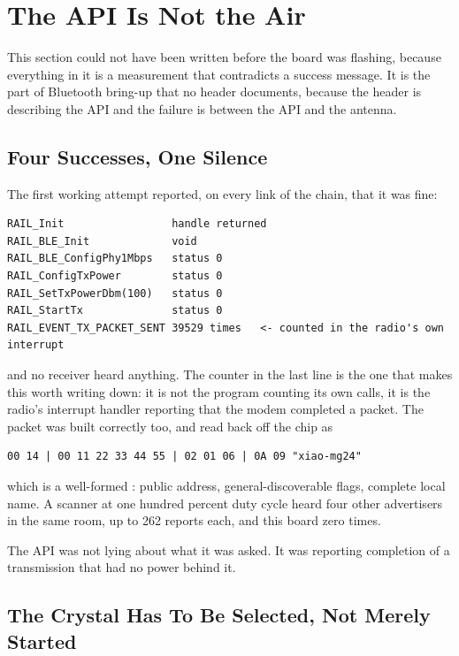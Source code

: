 \section{The API Is Not the Air}
\label{sec:ble-api-not-air}

This section could not have been written before the board was flashing, because everything in it is a
measurement that contradicts a success message. It is the part of Bluetooth bring-up that no header
documents, because the header is describing the API and the failure is between the API and the antenna.

\subsection{Four Successes, One Silence}

The first working attempt reported, on every link of the chain, that it was fine:

\begin{verbatim}
RAIL_Init                 handle returned
RAIL_BLE_Init             void
RAIL_BLE_ConfigPhy1Mbps   status 0
RAIL_ConfigTxPower        status 0
RAIL_SetTxPowerDbm(100)   status 0
RAIL_StartTx              status 0
RAIL_EVENT_TX_PACKET_SENT 39529 times   <- counted in the radio's own interrupt
\end{verbatim}

and no receiver heard anything. The counter in the last line is the one that makes this worth writing
down: it is not the program counting its own calls, it is the radio's interrupt handler reporting that
the modem completed a packet. The packet was built correctly too, and read back off the chip as

\begin{verbatim}
00 14 | 00 11 22 33 44 55 | 02 01 06 | 0A 09 "xiao-mg24"
\end{verbatim}

which is a well-formed : public address, general-discoverable flags, complete local
name. A scanner at one hundred percent duty cycle heard four other advertisers in the same room, up to
262 reports each, and this board zero times.

The API was not lying about what it was asked. It was reporting completion of a transmission that had
no power behind it.

\subsection{The Crystal Has To Be Selected, Not Merely Started}

